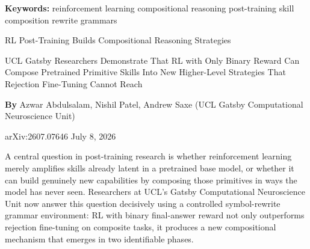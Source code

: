 \documentclass[10pt,twocolumn]{article}
\begin{document}
\setlength{\parindent}{0pt}
\setlength{\parskip}{4pt}

{\small\color{keywordgray}\textbf{Keywords:}
  reinforcement learning \textbullet{}
  compositional reasoning \textbullet{}
  post-training \textbullet{}
  skill composition \textbullet{}
  rewrite grammars}\par\vspace{4pt}

{\LARGE\bfseries\raggedright
  RL Post-Training Builds Compositional Reasoning Strategies}\par\vspace{4pt}

{\large\itshape\raggedright
  UCL Gatsby Researchers Demonstrate That RL with Only Binary Reward Can
  Compose Pretrained Primitive Skills Into New Higher-Level Strategies
  That Rejection Fine-Tuning Cannot Reach}\par\vspace{6pt}

{\small\textbf{By} Azwar Abdulsalam, Nishil Patel, Andrew Saxe
  (UCL Gatsby Computational Neuroscience Unit)}\par\vspace{2pt}

{\small\color{keywordgray}arXiv:2607.07646 \textbullet{}
  July 8, 2026}
\par\vspace{2pt}\noindent{\color{rulered}\rule{\columnwidth}{0.6pt}}\vspace{6pt}

A central question in post-training research is whether reinforcement
learning merely amplifies skills already latent in a pretrained base
model, or whether it can build genuinely new capabilities by composing
those primitives in ways the model has never seen.
Researchers at UCL's Gatsby Computational Neuroscience Unit now
answer this question decisively using a controlled symbol-rewrite
grammar environment: RL with binary final-answer reward not only
outperforms rejection fine-tuning on composite tasks, it produces
a new compositional mechanism that emerges in two identifiable phases.
\end{document}
